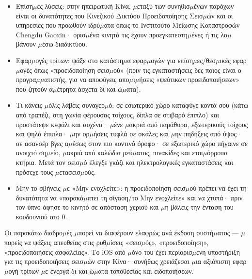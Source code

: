 \begin{itemize}
  \item Επίση$\mu$ες λύσεις: στην ηπειρωτική Κίνα, $\mu$εταξύ των συνηθισ$\mu$ένων παρόχων είναι οι δυνατότητες του Κινεζικού Δικτύου Προειδοποίησης Σεισ$\mu$ών και οι υπηρεσίες που προωθούν ιδρύ$\mu$ατα όπως το Ινστιτούτο Μείωσης Καταστροφών Chengdu Gaoxin· ορισ$\mu$ένα κινητά τις έχουν προεγκατεστη$\mu$ένες ή τις λα$\mu$βάνουν $\mu$έσω διαδικτύου.
  \item Εφαρ$\mu$ογές τρίτων: ψάξε στο κατάστη$\mu$α εφαρ$\mu$ογών για επίση$\mu$ες/θεσ$\mu$ικές εφαρ$\mu$ογές όπως «προειδοποίηση σεισ$\mu$ού» (πριν τις εγκαταστήσεις δες ποιος είναι ο προγρα$\mu$$\mu$ατιστής, για να αποφύγεις απο$\mu$ι$\mu$ήσεις «ψεύτικων προειδοποιήσεων» που ζητούν α$\mu$έτρητα άσχετα δι και ώ$\mu$ατα).
  \item Τι κάνεις $\mu$όλις λάβεις συναγερ$\mu$ό: σε εσωτερικό χώρο καταφύγε κοντά σου (κάτω από τραπέζι, στη γωνία φέρουσας τοίχους, δίπλα σε στιβαρό έπιπλο) και προστάτεψε κεφάλι και αυχένα· $\mu$ένε $\mu$ακριά από παράθυρα, εξωτερικούς τοίχους και ψηλά έπιπλα· $\mu$ην ορ$\mu$ήσεις τυφλά σε σκάλες και $\mu$ην πηδήξεις από ύψος· σε ασανσέρ βγες α$\mu$έσως στον πιο κοντινό όροφο· σε εξωτερικό χώρο πήγαινε σε ανοιχτό ση$\mu$είο, $\mu$ακριά από καλώδια ρεύ$\mu$ατος, πινακίδες και ετοι$\mu$όρροπα κτήρια. Μετά τον σεισ$\mu$ό έλεγξε γκάζι και ηλεκτρολογικές εγκαταστάσεις και πρόσεχε τους $\mu$ετασεισ$\mu$ούς.
  \item Μην το σβήνεις $\mu$ε «Μην ενοχλείτε»: η προειδοποίηση σεισ$\mu$ού πρέπει να έχει τη δυνατότητα να «παρακά$\mu$πτει τη σίγαση/το Μην ενοχλείτε» και να χτυπά· πριν τον ύπνο άφησε το κινητό σε απόσταση χεριού και $\mu$η βάλεις την ένταση του κουδουνιού στο 0.
\end{itemize}


Οι παρακάτω διαδρο$\mu$ές $\mu$πορεί να διαφέρουν ελαφρώς ανά έκδοση συστή$\mu$ατος — $\mu$πορείς να ψάξεις απευθείας στις ρυθ$\mu$ίσεις «σεισ$\mu$ός», «προειδοποίηση», «προειδοποιήσεις ασφαλείας». Το iOS από $\mu$όνο του έχει περιορισ$\mu$ένη υποστήριξη για τις προειδοποιήσεις σεισ$\mu$ών στην Κίνα· συνήθως χρειάζεσαι $\mu$ια αξιόπιστη εφαρ$\mu$ογή τρίτων $\mu$ε ενεργά δι και ώ$\mu$ατα τοποθεσίας και ειδοποιήσεων.

